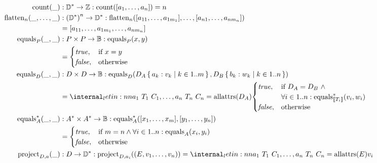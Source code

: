 \begin{align*}
\scount(\_) &: \sdom^{*} \to \sint : \scount([a_1, \dots, a_n]) = n \\
\sflatten_n(\_, \dots, \_) &: \left(\sdom^{*}\right)^n \to \sdom^{*} : \sflatten_n([a_{11}, \dots, a_{1m_1}], \dots, [a_{n1}, \dots, a_{nm_n}]) \\
&= [a_{11}, \dots, a_{1m_1}, \dots, a_{nm_n}] \\
\seq_P(\_, \_) &: P \times P \to \sboolean : \seq_P(x, y) \\
&= \begin{cases}
\strue, & \text{if } x = y \\
\sfalse, & \text{otherwise}
\end{cases} \\
\seq_D(\_, \_) &: D \times D \to \sboolean : \seq_D(D_A \set{a_{k}: v_k \mid k\in 1..m}, D_B \set{b_{k}: w_k \mid k\in 1..n}) \\
&= \letin{a_1\ T_1\ C_1, \dots, a_n\ T_n\ C_n = \allattrs(D_A)}{\begin{cases}
\strue, & \text{if } D_A = D_B~\land \\
& \forall i \in 1..n: \lv{\seq}_{|[T_i|]}(v_{i}, w_{i}) \\
\sfalse, & \text{otherwise}
\end{cases}} \\
\lv{\seq}_A(\_, \_) &: A^{*} \times A^{*} \to \sboolean : \lv{\seq}_A([x_1, \dots, x_m], [y_1, \dots, y_n]) \\
&= \begin{cases}
\strue, & \text{if } m = n \land \forall i\in 1..n: \seq_A(x_i, y_i) \\
\sfalse, & \text{otherwise}
\end{cases} \\
\sproject_{D, a}(\_) &: D \to \sdom^{*} : \sproject_{D, a_i}((E, v_1, \dots, v_n)) = \letin{a_1\ T_1\ C_1, \dots, a_n\ T_n\ C_n = \allattrs(E)}{v_i}
\end{align*}
